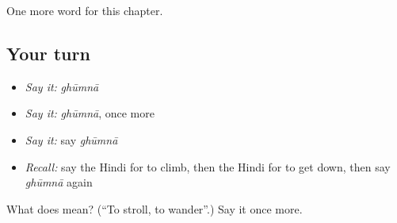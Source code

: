 \begin{grammarlens}[title={What you've built}]
One more word for this chapter.
\end{grammarlens}

\subsection*{Your turn}
\begin{itemize}
\raggedright
  \item \emph{Say it:} \emph{ghūmnā}
  \item \emph{Say it:} \emph{ghūmnā}, once more
  \item \emph{Say it:} say \emph{ghūmnā}
  \item \emph{Recall:} say the Hindi for to climb, then the Hindi for to get down, then say \emph{ghūmnā} again
\end{itemize}

\begin{tcolorbox}[breakable,colback=teal!4,colframe=teal!35!black,title={Before you move on}]
What does  mean? (\textquotedblleft{}To stroll, to wander\textquotedblright{}.) Say it once more.
\end{tcolorbox}
